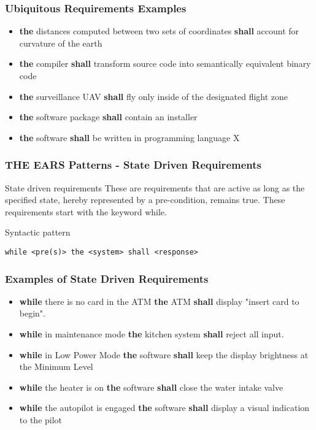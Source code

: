 \documentclass[aspectratio=169]{beamer}
\newcommand{\earsu}[2]{{\bf \color{mypurple}the} {#1} {\bf \color{mypurple}shall} {#2}}
\newcommand{\earss}[3]{{\bf \color{mygreen}while} {#1} {\bf \color{mypurple}the} {#2} {\bf \color{mypurple}shall} {#3}}
\begin{document}
%
\begin{frame}[fragile]
  \frametitle{Ubiquitous Requirements Examples}
  \begin{example}
  \begin{itemize}
    \item \earsu{distances computed between two sets of coordinates}{account for curvature of the earth}    
    \item \earsu{compiler}{transform source code into semantically equivalent binary code}
    \item \earsu{surveillance UAV}{fly only inside of the designated flight zone}
    \item \earsu{software package}{contain an installer}
    \item \earsu{software}{be written in programming language X}
  \end{itemize}
  \end{example}
\end{frame}
%
%
\begin{frame}[fragile]
 \frametitle{THE EARS Patterns - State Driven Requirements}
 \begin{block}{State driven requirements}
  These are requirements that are active as long as the specified state, hereby represented by a pre-condition, remains true. These requirements start with the keyword while.
  \end{block}
  \begin{block}{Syntactic pattern}
  \begin{lstlisting}[language=EARS]
              while <pre(s)> the <system> shall <response>
  \end{lstlisting}  
  \end{block}
\end{frame}
%
\begin{frame}
  \frametitle{Examples of State Driven Requirements}
  \begin{example}
  \begin{itemize}
    \item \earss{there is no card in the ATM}{ATM}{display "insert card to begin"}.
    \item \earss{in maintenance mode}{kitchen system}{reject all input}.
    \item \earss{in Low Power Mode}{software}{keep the display brightness at the Minimum Level}
    \item \earss{the heater is on}{software}{close the water intake valve}
    \item \earss{the autopilot is engaged}{software}{display a visual indication to the pilot}
  \end{itemize}
 \end{example}
\end{frame}
\end{document}
